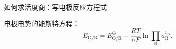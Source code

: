 \begin{notation}
    如何求活度商：写电极反应方程式
\end{notation}
电极电势的能斯特方程：
\[
    E_\text{O/R} = E^\ominus _\text{O/R} - \frac{RT}{nF} \ln \prod_{\text{B}}^{} a_\text{B}^{v_\text{B}}
.\]

